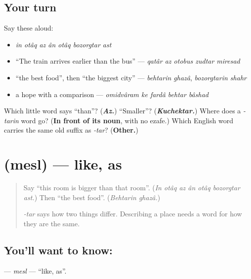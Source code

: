 \subsection*{Your turn}
Say these aloud:

\begin{itemize}
\raggedright
  \item \emph{in otâq az ân otâq bozorgtar ast}
  \item \textquotedblleft{}The train arrives earlier than the bus\textquotedblright{} — \emph{qatâr az otobus zudtar miresad}
  \item \textquotedblleft{}the best food\textquotedblright{}, then \textquotedblleft{}the biggest city\textquotedblright{} — \emph{behtarin ghazâ}, \emph{bozorgtarin shahr}
  \item a hope with a comparison — \emph{omidvâram ke fardâ behtar bâshad}
\end{itemize}

\begin{tcolorbox}[breakable,colback=teal!4,colframe=teal!35!black,title={Before you move on}]
Which little word says \textquotedblleft{}than\textquotedblright{}? (\emph{\textbf{Az.}}) \textquotedblleft{}Smaller\textquotedblright{}? (\emph{\textbf{Kuchektar.}}) Where does a \emph{-tarin} word go? (\textbf{In front of its noun}, with no ezafe.) Which English word carries the same old suffix as \emph{-tar}? (\textbf{Other.})
\end{tcolorbox}
\section[\texorpdfstring{\fa{مثل} (mesl)}{مثل (mesl)}]{ (mesl) — like, as}

\label{lesson:FA-C297-mesl}



\begin{quote}
Say \textquotedblleft{}this room is bigger than that room\textquotedblright{}. (\emph{In otâq az ân otâq bozorgtar ast.}) Then \textquotedblleft{}the best food\textquotedblright{}. (\emph{Behtarin ghazâ.})

\emph{-tar} says how two things differ. Describing a place needs a word for how they are the same.
\end{quote}

\subsection*{You'll want to know: }
\textbf{} — \emph{mesl} — \textquotedblleft{}like, as\textquotedblright{}.

